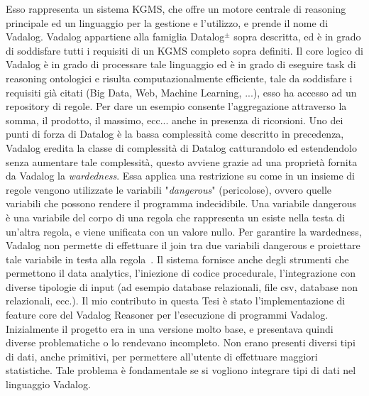Esso rappresenta un sistema KGMS, che offre un motore centrale di reasoning principale ed un linguaggio per la gestione e l'utilizzo, e prende il nome di Vadalog. \newline
Vadalog appartiene alla famiglia Datalog$^\pm$ sopra descritta, ed è in grado di soddisfare tutti i requisiti di un KGMS completo sopra definiti. \newline
Il core logico di Vadalog è in grado di processare tale linguaggio ed è in grado di eseguire task di reasoning ontologici e risulta computazionalmente efficiente, tale da soddisfare i requisiti già citati (Big Data, Web, Machine Learning, ...), esso ha accesso ad un repository di regole. Per dare un esempio consente l'aggregazione attraverso la somma, il prodotto, il massimo, ecc... anche in presenza di ricorsioni. \newline
Uno dei punti di forza di Datalog è la bassa complessità come descritto in precedenza, Vadalog eredita la classe di complessità di Datalog catturandolo ed estendendolo senza aumentare tale complessità, questo avviene grazie ad una proprietà fornita da Vadalog la \textit{wardedness}. Essa applica una restrizione su come in un insieme di regole vengono utilizzate le variabili "\textit{dangerous}" (pericolose), ovvero quelle variabili che possono rendere il programma indecidibile. \newline
Una variabile dangerous è una variabile del corpo di una regola che rappresenta un esiste nella testa di un'altra regola, e viene unificata con un valore nullo. Per garantire la wardedness, Vadalog non permette di effettuare il join tra due variabili dangerous e proiettare tale variabile in testa alla regola~\cite{bellomarini2017swift}. \newline
Il sistema fornisce anche degli strumenti che permettono il data analytics, l'iniezione di codice procedurale, l'integrazione con diverse tipologie di input (ad esempio database relazionali, file csv, database non relazionali, ecc.).\newline \newline
Il mio contributo in questa Tesi è stato l'implementazione di feature core del Vadalog Reasoner per l'esecuzione di programmi Vadalog. \newline
Inizialmente il progetto era in una versione molto base, e presentava quindi diverse problematiche o lo rendevano incompleto. \newline
Non erano presenti diversi tipi di dati, anche primitivi, per permettere all'utente di effettuare maggiori statistiche. Tale problema è fondamentale se si vogliono integrare tipi di dati nel linguaggio Vadalog. \newline
